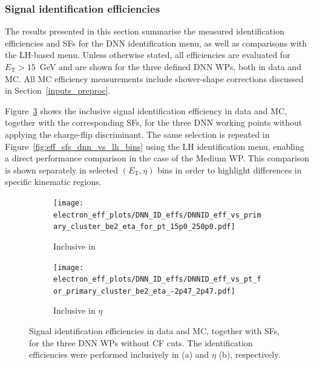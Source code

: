 
\subsubsection{Signal identification efficiencies}

The results presented in this section summarise the measured identification efficiencies and SFs for the DNN identification menu, as well as comparisons with the LH-based menu. Unless otherwise stated, all efficiencies are evaluated for $E_{\mathrm{T}}>15$~GeV and are shown for the three defined DNN WPs, both in data and MC. All MC efficiency measurements include shower-shape corrections discussed in Section~\ref{inputs_preproc}.

Figure~\ref{fig:eff_sfs_dnn_inclusive} shows the inclusive signal identification efficiency in data and MC, together with the corresponding SFs, for the three DNN working points without applying the charge-flip discriminant. The same selection is repeated in Figure~\ref{fig:eff_sfs_dnn_vs_lh_bins} using the LH identification menu, enabling a direct performance comparison in the case of the Medium WP. This comparison is shown separately in selected $(E_{\mathrm{T}},\eta)$ bins in order to highlight differences in specific kinematic regions. 

\begin{figure}[htbp]
  \centering
  \begin{subfigure}{0.48\textwidth}
    \centering
    \texttt{[image: electron\_eff\_plots/DNN\_ID\_effs/DNNID\_eff\_vs\_primary\_cluster\_be2\_eta\_for\_pt\_15p0\_250p0.pdf]}
    \caption{Inclusive in \et}
    \label{fig:eff_inclusive_pt_dnn_id}
  \end{subfigure}
  \hfill
  \begin{subfigure}{0.48\textwidth}
    \centering
    \texttt{[image: electron\_eff\_plots/DNN\_ID\_effs/DNNID\_eff\_vs\_pt\_for\_primary\_cluster\_be2\_eta\_-2p47\_2p47.pdf]}
    \caption{Inclusive in $\eta$}
    \label{fig:eff_inclusive_eta_dnn_id}
  \end{subfigure}
  \caption{Signal identification efficiencies in data and MC, together with SFs, for the three DNN WPs without CF cuts. The identification efficiencies were performed inclusively in \et (a) and $\eta$ (b), respectively.}
  \label{fig:eff_sfs_dnn_inclusive}
\end{figure}


